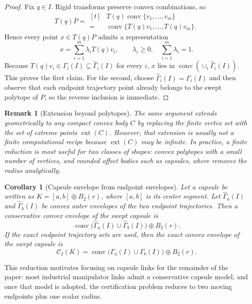 \documentclass[journal]{IEEEtran}
\newtheorem{remark}{Remark}
\newtheorem{corollary}{Corollary}
\begin{document}
\begin{proof}
Fix $q\in I$. Rigid transforms preserve convex combinations, so
\[
T(q)P
= \begin{aligned}[t]
&T(q)\operatorname{conv}\{v_1,\dots,v_m\} \\
=\;&\operatorname{conv}\{T(q)v_1,\dots,T(q)v_m\}.
\end{aligned}
\]
Hence every point $x \in T(q)P$ admits a representation
\[
x = \sum_{i=1}^m \lambda_i T(q)v_i,
\qquad \lambda_i\ge 0,
\quad \sum_{i=1}^m \lambda_i = 1.
\]
Because $T(q)v_i \in \Gamma_i(I) \subseteq \widehat{\Gamma}_i(I)$ for every $i$,
$x$ lies in $\operatorname{conv}(\cup_i \widehat{\Gamma}_i(I))$. This proves the
first claim. For the second, choose
$\widehat{\Gamma}_i(I)=\Gamma_i(I)$ and then observe that each endpoint
trajectory point already belongs to the swept polytope of $P$, so the reverse
inclusion is immediate.
\end{proof}

\begin{remark}[Extension beyond polytopes]\label{rem:general_convex}
The same argument extends geometrically to any compact convex body $C$ by
replacing the finite vertex set with the set of extreme points
$\operatorname{ext}(C)$. However, that extension is usually not a finite
computational recipe because $\operatorname{ext}(C)$ may be infinite. In
practice, a finite reduction is most useful for two classes of shapes: convex
polytopes with a small number of vertices, and rounded offset bodies such as
capsules, where  removes the radius analytically.
\end{remark}

\begin{corollary}[Capsule envelope from endpoint envelopes]
\label{cor:capsule_lift}
Let a capsule be written as $K=[a,b]\oplus B_2(r)$, where $[a,b]$ is its center
segment. Let $\widehat{\Gamma}_a(I)$ and $\widehat{\Gamma}_b(I)$ be convex outer
envelopes of the two endpoint trajectories. Then a conservative convex envelope
of the swept capsule is
\[
\operatorname{conv}\bigl(\widehat{\Gamma}_a(I) \cup
\widehat{\Gamma}_b(I)\bigr) \oplus B_2(r).
\]
If the exact endpoint trajectory sets are used, then the exact convex envelope
of the swept capsule is
\[
\mathcal{C}_I(K)
= \operatorname{conv}\bigl(\Gamma_a(I) \cup \Gamma_b(I)\bigr)
\oplus B_2(r).
\]
\end{corollary}

  This reduction motivates focusing on capsule links for the remainder of the
  paper: most industrial manipulator links admit a conservative capsule model,
  and once that model is adopted, the certification problem reduces to two
  moving endpoints plus one scalar radius.
\end{document}
